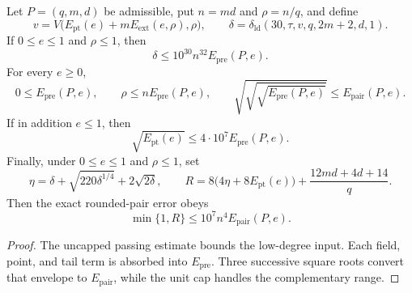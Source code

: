 \begin{theorem}
\label{thm:qld-coefficient-thirty-rounding-scalars}
\leanok
{}
Let $P=(q,m,d)$ be admissible, put $n=md$ and $\rho=n/q$, and define
\[
 v=V\bigl(E_{\mathrm{pt}}(e)+mE_{\mathrm{ext}}(e,\rho),\rho\bigr),
 \qquad
 \delta=\delta_{\mathrm{ld}}(30,\tau,v,q,2m+2,d,1).
\]
If $0\leq e\leq1$ and $\rho\leq1$, then
\[
 \delta\leq10^{30}n^{32}E_{\mathrm{pre}}(P,e).
\]
For every $e\geq0$,
\[
 0\leq E_{\mathrm{pre}}(P,e),
 \qquad
 \rho\leq nE_{\mathrm{pre}}(P,e),
 \qquad
 \sqrt{\sqrt{\sqrt{E_{\mathrm{pre}}(P,e)}}}
 \leq E_{\mathrm{pair}}(P,e).
\]
If in addition $e\leq1$, then
\[
 \sqrt{E_{\mathrm{pt}}(e)}\leq4\cdot10^7E_{\mathrm{pre}}(P,e).
\]
Finally, under $0\leq e\leq1$ and $\rho\leq1$, set
\[
 \eta=\delta+\sqrt{220\delta^{1/4}}+2\sqrt{2\delta},
 \qquad
 R=8\bigl(4\eta+8E_{\mathrm{pt}}(e)\bigr)
   +\frac{12md+4d+14}{q}.
\]
Then the exact rounded-pair error obeys
\[
 \min\{1,R\}\leq10^7n^4E_{\mathrm{pair}}(P,e).
\]
\end{theorem}
\begin{proof}
\leanok
{}
The uncapped passing estimate bounds the low-degree input. Each field, point,
and tail term is absorbed into $E_{\mathrm{pre}}$. Three successive square
roots convert that envelope to $E_{\mathrm{pair}}$, while the unit cap handles
the complementary range.
\end{proof}

